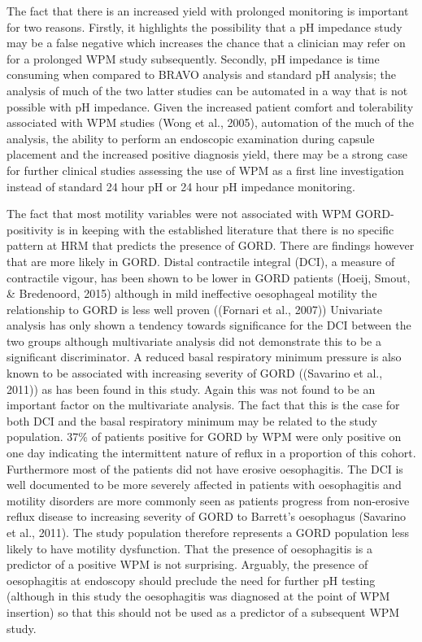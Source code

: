\documentclass[english,man,floatsintext]{apa6}
\begin{document}
The fact that there is an increased yield with prolonged monitoring is important for two reasons. Firstly, it highlights the possibility that a pH impedance study may be a false negative which increases the chance that a clinician may refer on for a prolonged WPM study subsequently. Secondly, pH impedance is time consuming when compared to BRAVO analysis and standard pH analysis; the analysis of much of the two latter studies can be automated in a way that is not possible with pH impedance. Given the increased patient comfort and tolerability associated with WPM studies (Wong et al., 2005), automation of the much of the analysis, the ability to perform an endoscopic examination during capsule placement and the increased positive diagnosis yield, there may be a strong case for further clinical studies assessing the use of WPM as a first line investigation instead of standard 24 hour pH or 24 hour pH impedance monitoring.

The fact that most motility variables were not associated with WPM GORD-positivity is in keeping with the established literature that there is no specific pattern at HRM that predicts the presence of GORD. There are findings however that are more likely in GORD. Distal contractile integral (DCI), a measure of contractile vigour, has been shown to be lower in GORD patients (Hoeij, Smout, \& Bredenoord, 2015) although in mild ineffective oesophageal motility the relationship to GORD is less well proven ((Fornari et al., 2007)) Univariate analysis has only shown a tendency towards significance for the DCI between the two groups although multivariate analysis did not demonstrate this to be a significant discriminator. A reduced basal respiratory minimum pressure is also known to be associated with increasing severity of GORD ((Savarino et al., 2011)) as has been found in this study. Again this was not found to be an important factor on the multivariate analysis. The fact that this is the case for both DCI and the basal respiratory minimum may be related to the study population. 37\% of patients positive for GORD by WPM were only positive on one day indicating the intermittent nature of reflux in a proportion of this cohort. Furthermore most of the patients did not have erosive oesophagitis. The DCI is well documented to be more severely affected in patients with oesophagitis and motility disorders are more commonly seen as patients progress from non-erosive reflux disease to increasing severity of GORD to Barrett's oesophagus (Savarino et al., 2011). The study population therefore represents a GORD population less likely to have motility dysfunction. That the presence of oesophagitis is a predictor of a positive WPM is not surprising. Arguably, the presence of oesophagitis at endoscopy should preclude the need for further pH testing (although in this study the oesophagitis was diagnosed at the point of WPM insertion) so that this should not be used as a predictor of a subsequent WPM study.
\end{document}
